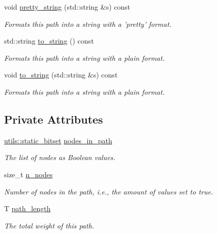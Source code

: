 \begin{DoxyCompactItemize}
void \hyperlink{classlgraph_1_1boolean__path_ac4a89490082847487ec6d0bc76d546a0}{pretty\-\_\-string} (std\-::string \&s) const 
\begin{DoxyCompactList}\small\item\em Formats this path into a string with a 'pretty' format. \end{DoxyCompactList}\item 
std\-::string \hyperlink{classlgraph_1_1boolean__path_aec231697faf9b19bf98002719631494c}{to\-\_\-string} () const 
\begin{DoxyCompactList}\small\item\em Formats this path into a string with a plain format. \end{DoxyCompactList}\item 
void \hyperlink{classlgraph_1_1boolean__path_ab1bbf257e568c16bdc825ead3bd25590}{to\-\_\-string} (std\-::string \&s) const 
\begin{DoxyCompactList}\small\item\em Formats this path into a string with a plain format. \end{DoxyCompactList}\end{DoxyCompactItemize}
\subsection*{Private Attributes}
\begin{DoxyCompactItemize}
\item 
\hyperlink{classlgraph_1_1utils_1_1static__bitset}{utils\-::static\-\_\-bitset} \hyperlink{classlgraph_1_1boolean__path_a0ea5d4c5f7e445270bb5c0346ec7c150}{nodes\-\_\-in\-\_\-path}
\begin{DoxyCompactList}\small\item\em The list of nodes as Boolean values. \end{DoxyCompactList}\item 
\hypertarget{classlgraph_1_1boolean__path_a98f07b983e0812fd283f16c3871793ef}{size\-\_\-t \hyperlink{classlgraph_1_1boolean__path_a98f07b983e0812fd283f16c3871793ef}{n\-\_\-nodes}}\label{classlgraph_1_1boolean__path_a98f07b983e0812fd283f16c3871793ef}

\begin{DoxyCompactList}\small\item\em Number of nodes in the path, i.\-e., the amount of values set to true. \end{DoxyCompactList}\item 
T \hyperlink{classlgraph_1_1boolean__path_ab298ac156fd7d73e21769fd30b2c5ad1}{path\-\_\-length}
\begin{DoxyCompactList}\small\item\em The total weight of this path. \end{DoxyCompactList}\end{DoxyCompactItemize}
